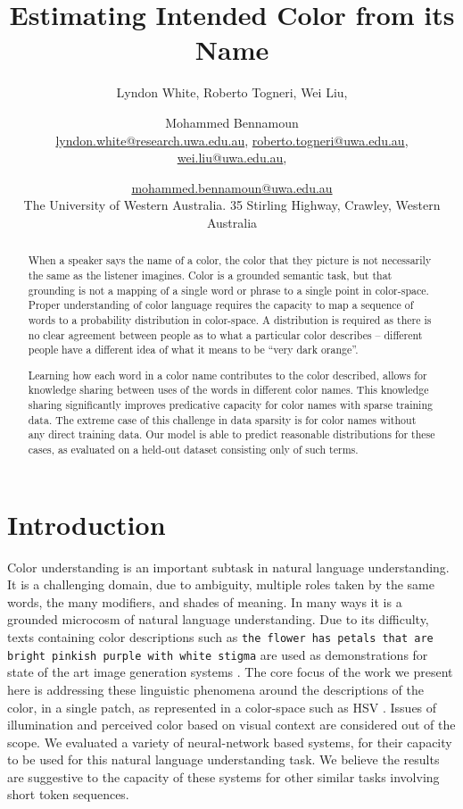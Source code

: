 \documentclass[11pt,a4paper]{article}
\title{Estimating Intended Color from its Name}
\author{Lyndon White, %
	Roberto Togneri, %
	Wei Liu, %
	\and Mohammed Bennamoun%
	\\ 
	\url{lyndon.white@research.uwa.edu.au}, %
	\url{roberto.togneri@uwa.edu.au},\\
	\url{wei.liu@uwa.edu.au}, %
	\and \url{mohammed.bennamoun@uwa.edu.au}%
	\\
	The University of Western Australia.
	35 Stirling Highway, Crawley, Western Australia
}
\newcommand{\parencite}{\citep}
\begin{document}
\maketitle

\begin{abstract}
When a speaker says the name of a color, the color that they picture is not necessarily the same as the listener imagines.
Color is a grounded semantic task, but that grounding is not a mapping of a single word or phrase to a single point in color-space.
Proper understanding of color language requires the capacity to map a sequence of words to a probability distribution in color-space.
A distribution is required as there is no clear agreement between people as to what a particular color describes -- different people have a different idea of what it means to be ``very dark orange''.

Learning how each word in a color name contributes to the color described,
allows for knowledge sharing between uses of the words in different color names.
This knowledge sharing significantly improves predicative capacity for color names with sparse training data.
The extreme case of this challenge in data sparsity is for color names without any direct training data.
Our model is able to predict reasonable distributions for these cases, as evaluated on a held-out dataset consisting only of such terms.
\end{abstract}

\section{Introduction}\label{sec:intro}

Color understanding is an important subtask in natural language understanding.
It is a challenging domain, due to ambiguity, multiple roles taken by the same words, the many modifiers, and shades of meaning.
In many ways it is a grounded microcosm of natural language understanding.
Due to its difficulty, texts containing color descriptions such as \texttt{the flower has petals that are bright pinkish purple with white stigma} are used as demonstrations for state of the art image generation systems \parencite{reed2016generative, 2015arXiv151102793M}.
The core focus of the work we present here is addressing these linguistic phenomena around the descriptions of the color, in a single patch, as represented in a color-space such as HSV \parencite{smith1978color}.
Issues of illumination and perceived color based on visual context are considered out of the scope.
We evaluated a variety of neural-network based systems, for their capacity to be used for this natural language understanding task.
We believe the results are suggestive to the capacity of these systems for other similar tasks involving short token sequences.
\end{document}
